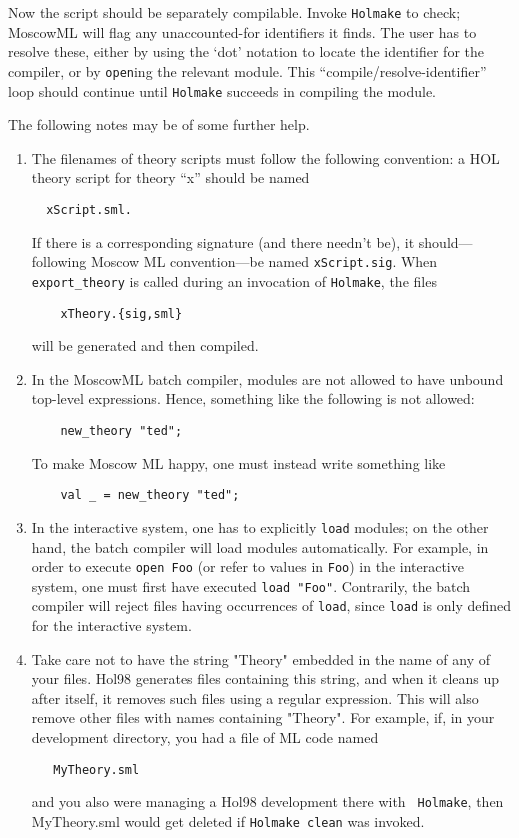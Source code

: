 Now the script should be separately compilable. Invoke {\tt Holmake}
to check; MoscowML will flag any unaccounted-for identifiers it finds.
The user has to resolve these, either by using the `dot' notation to
locate the identifier for the compiler, or by \verb+open+ing the
relevant module. This ``compile/resolve-identifier'' loop should
continue until {\tt Holmake} succeeds in compiling the module.

The following notes may be of some further help.

\begin{enumerate}
\item The filenames of theory scripts must follow the following
  convention: a HOL theory script for theory ``x'' should be named
\begin{verbatim}
  xScript.sml.
\end{verbatim}
  If there is a corresponding signature (and there needn't be), it
  should---following Moscow ML convention---be named
  \verb+xScript.sig+. When \verb+export_theory+ is called during an
  invocation of \verb+Holmake+, the files
\begin{verbatim}
    xTheory.{sig,sml}
\end{verbatim}
will be generated and then compiled.

\item In the MoscowML batch compiler, modules are not allowed to have
  unbound top-level expressions. Hence, something like the following
  is not allowed:
\begin{verbatim}
    new_theory "ted";
\end{verbatim}
To make Moscow ML happy, one must instead write something like
\begin{verbatim}
    val _ = new_theory "ted";
\end{verbatim}

\item In the interactive system, one has to explicitly \verb+load+
  modules; on the other hand, the batch compiler will load modules
  automatically.  For example, in order to execute \verb+open Foo+ (or
  refer to values in \verb+Foo+) in the interactive system, one must
  first have executed \verb+load "Foo"+. Contrarily, the batch
  compiler will reject files having occurrences of \verb+load+, since
  \verb+load+ is only defined for the interactive system.

\item Take care not to have the string "Theory" embedded in the name
  of any of your files. Hol98 generates files containing this string,
  and when it cleans up after itself, it removes such files using a
  regular expression. This will also remove other files with names
  containing "Theory". For example, if, in your development directory,
  you had a file of ML code named
\begin{verbatim}
   MyTheory.sml
\end{verbatim}
  and you also were managing a Hol98 development there with {\tt
    Holmake}, then MyTheory.sml would get deleted if {\tt Holmake
    clean} was invoked.


\end{enumerate}
